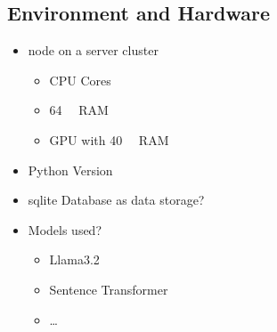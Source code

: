 \subsection{Environment and Hardware}

\begin{itemize}
  \item node on a server cluster
        \begin{itemize}
          \item CPU Cores
          \item \SI{64}{\giga\byte} RAM
          \item GPU with \SI{40}{\giga\byte} RAM
        \end{itemize}
  \item Python Version
  \item sqlite Database as data storage?
  \item Models used?
        \begin{itemize}
          \item Llama3.2
          \item Sentence Transformer
          \item \ldots
        \end{itemize}
\end{itemize}